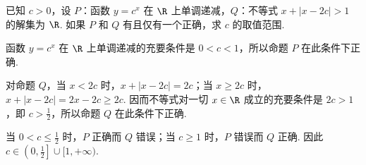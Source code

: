 \begin{problem}
已知 \(c > 0\)，设 \(P\)：函数 \(y = c^{x}\) 在 \(\R\) 上单调递减，\(Q\)：不等式 \(x + |x - 2c| > 1\) 的解集为 \(\R\). 如果 \(P\) 和 \(Q\) 有且仅有一个正确，求 \(c\) 的取值范围.

\begin{solution}
函数 \(y=c^{x}\) 在 \(\R\) 上单调递减的充要条件是 \(0<c<1\)，所以命题 \(P\) 在此条件下正确.

对命题 \(Q\)，当 \(x<2c\) 时，\(x+|x-2c|=2c\)；当 \(x\geq2c\) 时，\(x+|x-2c|=2x-2c\geq2c\). 因而不等式对一切 \(x\in\R\) 成立的充要条件是 \(2c>1\)，即 \(c>\frac{1}{2}\)，所以命题 \(Q\) 在此条件下正确.

当 \(0<c\leq\frac{1}{2}\) 时，\(P\) 正确而 \(Q\) 错误；当 \(c\geq1\) 时，\(P\) 错误而 \(Q\) 正确. 因此 \(c\in\left(0,\frac{1}{2}\right]\cup[1,+\infty)\).
\end{solution}
\end{problem}

